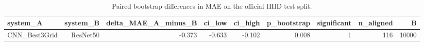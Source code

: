 \begin{table}[htbp]
\centering
\caption{Paired bootstrap differences in MAE on the official HHD test split.}
\label{tab:paired-bootstrap}
\begin{tabular}{lrrrrrrrr}
\toprule
system\_A & system\_B & delta\_MAE\_A\_minus\_B & ci\_low & ci\_high & p\_bootstrap & significant & n\_aligned & B \\
\midrule
CNN\_Best3Grid & ResNet50 & -0.373 & -0.633 & -0.102 & 0.008 & 1 & 116 & 10000 \\
\bottomrule
\end{tabular}
\end{table}
